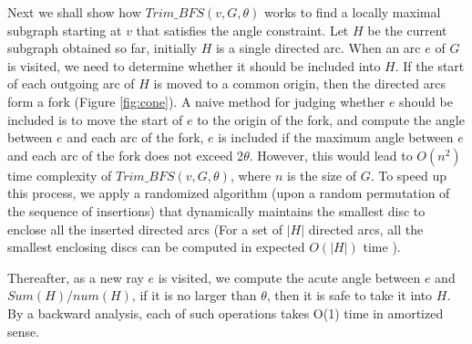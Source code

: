 Next we shall show how $Trim\_BFS(v, G, \theta)$ works to find a locally maximal subgraph starting at $v$ that satisfies the angle constraint. Let $H$ be the current subgraph obtained so far, initially $H$ is a single directed arc. When an arc $e$ of $G$ is visited, we need to determine whether it should be included into $H$. If the start of each outgoing arc of $H$ is moved to a common origin, then the directed arcs form a fork (Figure \ref{fig:cone}). A naive method for judging whether $e$ should be included is to move the start of $e$ to the origin of the fork, and compute the angle between $e$ and each arc of the fork, $e$ is included if the maximum angle between $e$ and each arc of the fork does not exceed 2$\theta$. However, this would lead to $O(n^{2})$ time complexity of $Trim\_BFS(v, G, \theta)$, where $n$ is the size of $G$. To speed up this process, we apply a randomized algorithm (upon a random permutation of the sequence of insertions) that dynamically maintains the smallest disc to enclose all the inserted directed arcs (For a set of $|H|$ directed arcs, all the smallest enclosing discs can be computed in expected $O(|H|)$ time \cite{de2000computational}).

Thereafter, as a new ray $e$ is visited, we compute the acute angle between $e$ and $Sum(H)/num(H)$, if it is no larger than $\theta$, then it is safe to take it into $H$. By a backward analysis, each of such operations takes O(1) time in amortized sense.

